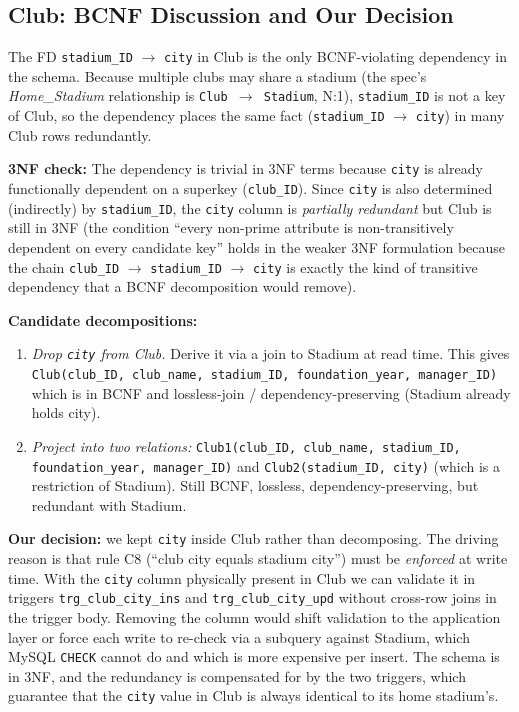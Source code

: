 \documentclass[11pt]{article}
\begin{document}
\subsection{Club: BCNF Discussion and Our Decision}

The FD \texttt{stadium\_ID} $\to$ \texttt{city} in Club is the only
BCNF-violating dependency in the schema. Because multiple clubs may
share a stadium (the spec's \emph{Home\_Stadium} relationship is
\texttt{Club $\to$ Stadium}, N:1), \texttt{stadium\_ID} is not a key of
Club, so the dependency places the same fact
(\texttt{stadium\_ID} $\to$ \texttt{city}) in many Club rows
redundantly.

\textbf{3NF check:} The dependency is trivial in 3NF terms because
\texttt{city} is already functionally dependent on a superkey
(\texttt{club\_ID}). Since \texttt{city} is also determined (indirectly)
by \texttt{stadium\_ID}, the \texttt{city} column is \emph{partially
redundant} but Club is still in 3NF (the condition ``every non-prime
attribute is non-transitively dependent on every candidate key'' holds
in the weaker 3NF formulation because the chain
\texttt{club\_ID} $\to$ \texttt{stadium\_ID} $\to$ \texttt{city} is
exactly the kind of transitive dependency that a BCNF decomposition
would remove).

\textbf{Candidate decompositions:}
\begin{enumerate}[leftmargin=*]
\item \emph{Drop \texttt{city} from Club.} Derive it via a join to
  Stadium at read time. This gives
  \texttt{Club(club\_ID, club\_name, stadium\_ID, foundation\_year, manager\_ID)}
  which is in BCNF and lossless-join / dependency-preserving (Stadium
  already holds city).
\item \emph{Project into two relations:}
  \texttt{Club1(club\_ID, club\_name, stadium\_ID, foundation\_year, manager\_ID)}
  and \texttt{Club2(stadium\_ID, city)} (which is a restriction of
  Stadium). Still BCNF, lossless, dependency-preserving, but redundant
  with Stadium.
\end{enumerate}

\textbf{Our decision:} we kept \texttt{city} inside Club rather than
decomposing. The driving reason is that rule C8 (``club city equals
stadium city'') must be \emph{enforced} at write time. With the
\texttt{city} column physically present in Club we can validate it in
triggers \texttt{trg\_club\_city\_ins} and
\texttt{trg\_club\_city\_upd} without cross-row joins in the trigger
body. Removing the column would shift validation to the application
layer or force each write to re-check via a subquery against Stadium,
which MySQL \texttt{CHECK} cannot do and which is more expensive per
insert. The schema is in 3NF, and the redundancy is compensated for by
the two triggers, which guarantee that the \texttt{city} value in Club
is always identical to its home stadium's.
\end{document}
